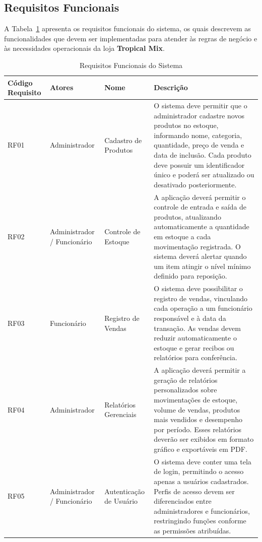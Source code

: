 \vspace{-0.5cm} %

\subsection{Requisitos Funcionais}

A Tabela~\ref{tab:requisitos-funcionais} apresenta os requisitos funcionais do sistema, os quais descrevem as funcionalidades que devem ser implementadas para atender às regras de negócio e às necessidades operacionais da loja \textbf{Tropical Mix}.

\begin{table}[H]
\centering
\caption{Requisitos Funcionais do Sistema}
\label{tab:requisitos-funcionais}
\begin{tabular}{|p{2cm}|p{3cm}|p{3.5cm}|p{7cm}|}
\hline
\textbf{Código Requisito} & \textbf{Atores} & \textbf{Nome} & \textbf{Descrição} \\ \hline
RF01 & Administrador & Cadastro de Produtos & O sistema deve permitir que o administrador cadastre novos produtos no estoque, informando nome, categoria, quantidade, preço de venda e data de inclusão. Cada produto deve possuir um identificador único e poderá ser atualizado ou desativado posteriormente. \\ \hline
RF02 & Administrador / Funcionário & Controle de Estoque & A aplicação deverá permitir o controle de entrada e saída de produtos, atualizando automaticamente a quantidade em estoque a cada movimentação registrada. O sistema deverá alertar quando um item atingir o nível mínimo definido para reposição. \\ \hline
RF03 & Funcionário & Registro de Vendas & O sistema deve possibilitar o registro de vendas, vinculando cada operação a um funcionário responsável e à data da transação. As vendas devem reduzir automaticamente o estoque e gerar recibos ou relatórios para conferência. \\ \hline
RF04 & Administrador & Relatórios Gerenciais & A aplicação deverá permitir a geração de relatórios personalizados sobre movimentações de estoque, volume de vendas, produtos mais vendidos e desempenho por período. Esses relatórios deverão ser exibidos em formato gráfico e exportáveis em PDF. \\ \hline
RF05 & Administrador / Funcionário & Autenticação de Usuário & O sistema deve conter uma tela de login, permitindo o acesso apenas a usuários cadastrados. Perfis de acesso devem ser diferenciados entre administradores e funcionários, restringindo funções conforme as permissões atribuídas. \\ \hline

\end{tabular}
\end{table}
